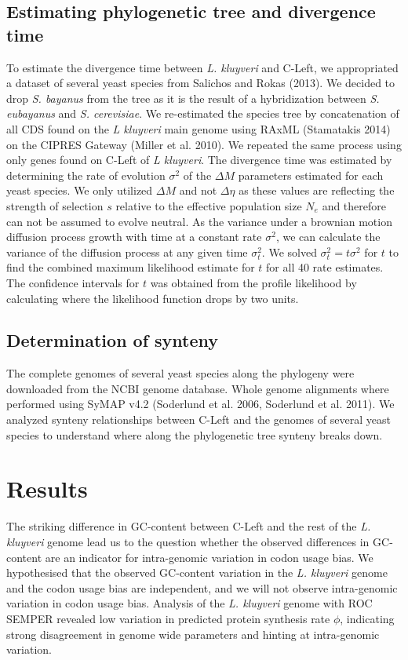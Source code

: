 \documentclass[12pt,draft]{article}
\begin{document}
\subsection{Estimating phylogenetic tree and divergence time}
To estimate the divergence time between \textit{L. kluyveri} and C-Left, we appropriated a dataset of several yeast species from Salichos and Rokas (2013). 
We decided to drop \textit{S. bayanus} from the tree as it is the result of a hybridization between \textit{S. eubayanus} and \textit{S. cerevisiae}.
We re-estimated the species tree by concatenation of all CDS found on the \textit{L kluyveri} main genome using RAxML (Stamatakis 2014) on the CIPRES Gateway (Miller et al. 2010).
We repeated the same process using only genes found on C-Left of \textit{L kluyveri}.
The divergence time was estimated by determining the rate of evolution $\sigma^2$ of the $\Delta M$ parameters estimated for each yeast species.
We only utilized $\Delta M$ and not $\Delta \eta$ as these values are reflecting the strength of selection $s$ relative to the effective population size $N_e$ and therefore can not be assumed to evolve neutral.
As the variance under a brownian motion diffusion process growth with time at a constant rate $\sigma^2$, we can calculate the variance of the diffusion process at any given time $\sigma^2_t$. 
We solved $\sigma^2_t = t\sigma^2$ for $t$ to find the combined maximum likelihood estimate for $t$ for all 40 rate estimates.
The confidence intervals for $t$ was obtained from the profile likelihood by calculating where the likelihood function drops by two units.
  
\subsection{Determination of synteny}	
The complete genomes of several yeast species along the phylogeny were downloaded from the NCBI genome database.
Whole genome alignments where performed using SyMAP v4.2 (Soderlund et al. 2006, Soderlund et al. 2011).
We analyzed synteny relationships between C-Left and the genomes of several yeast species to understand where along the phylogenetic tree synteny breaks down.
  
	
\section*{Results}
The striking difference in GC-content between C-Left and the rest of the \textit{L. kluyveri} genome lead us to the question whether the observed differences in GC-content are an indicator for intra-genomic variation in codon usage bias.
We hypothesised that the observed GC-content variation in the \textit{L. kluyveri} genome and the codon usage bias are independent, and we will not observe intra-genomic variation in codon usage bias.
Analysis of the \textit{L. kluyveri} genome with ROC SEMPER revealed low variation in predicted protein synthesis rate $\phi$, indicating strong disagreement in genome wide parameters and hinting at intra-genomic variation.
  
\end{document}
